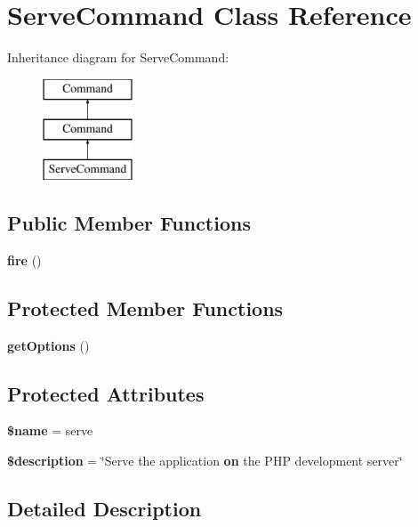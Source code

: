 \section{Serve\+Command Class Reference}
\label{class_illuminate_1_1_foundation_1_1_console_1_1_serve_command}
Inheritance diagram for Serve\+Command\+:\begin{figure}[H]
\begin{center}
\leavevmode
\includegraphics[height=3.000000cm]{class_illuminate_1_1_foundation_1_1_console_1_1_serve_command}
\end{center}
\end{figure}
\subsection*{Public Member Functions}
\begin{DoxyCompactItemize}
\item 
{\bf fire} ()
\end{DoxyCompactItemize}
\subsection*{Protected Member Functions}
\begin{DoxyCompactItemize}
\item 
{\bf get\+Options} ()
\end{DoxyCompactItemize}
\subsection*{Protected Attributes}
\begin{DoxyCompactItemize}
\item 
{\bf \$name} = \textquotesingle{}serve\textquotesingle{}
\item 
{\bf \$description} = \char`\"{}Serve the application {\bf on} the P\+H\+P development server\char`\"{}
\end{DoxyCompactItemize}


\subsection{Detailed Description}


